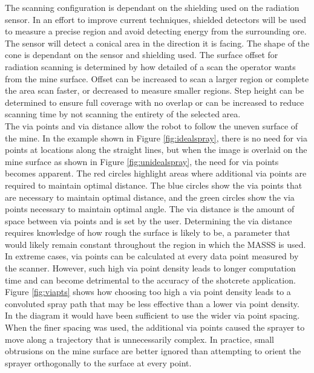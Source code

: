 The scanning configuration is dependant on the shielding used on the radiation sensor. In an effort to improve current techniques, shielded detectors will be used to measure a precise region and avoid detecting energy from the surrounding ore. The sensor will detect a conical area in the direction it is facing. The shape of the cone is dependant on the sensor and shielding used. The surface offset for radiation scanning is determined by how detailed of a scan the operator wants from the mine surface. Offset can be increased to scan a larger region or complete the area scan faster, or decreased to measure smaller regions. Step height can be determined to ensure full coverage with no overlap or can be increased to reduce scanning time by not scanning the entirety of the selected area.\\

The via points and via distance allow the robot to follow the uneven surface of the mine. In the example shown in Figure \ref{fig:idealspray}, there is no need for via points at locations along the straight lines, but when the image is overlaid on the mine surface as shown in Figure \ref{fig:unidealspray}, the need for via points becomes apparent. The red circles highlight areas where additional via points are required to maintain optimal distance. The blue circles show the via points that are necessary to maintain optimal distance, and the green circles show the via points necessary to maintain optimal angle. The via distance is the amount of space between via points and is set by the user. Determining the via distance requires knowledge of how rough the surface is likely to be, a parameter that would likely remain constant throughout the region in which the MASSS is used. In extreme cases, via points can be calculated at every data point measured by the scanner. However, such high via point density leads to longer computation time and can become detrimental to the accuracy of the shotcrete application. Figure \ref{fig:viapts} shows how choosing too high a via point density leads to a convoluted spray path that may be less effective than a lower via point density. In the diagram it would have been sufficient to use the wider via point spacing. When the finer spacing was used, the additional via points caused the sprayer to move along a trajectory that is unnecessarily complex.  In practice, small obtrusions on the mine surface are better ignored than attempting to orient the sprayer orthogonally to the surface at every point.\\

